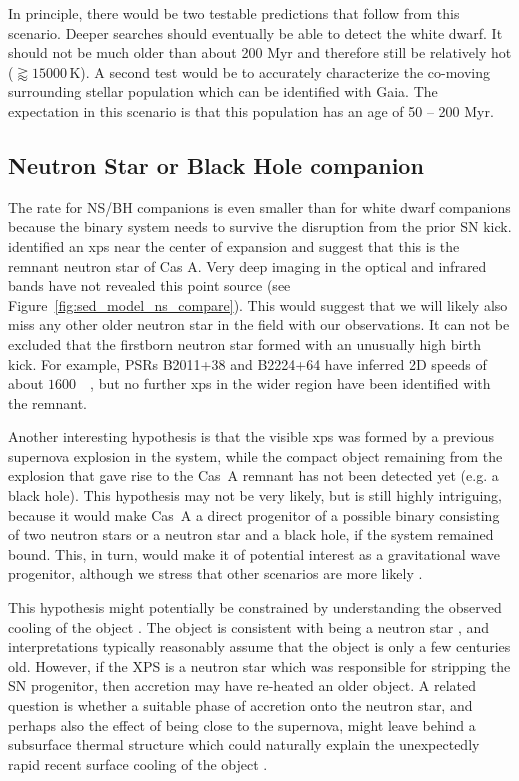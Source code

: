 \documentclass{aa}
\begin{document}
In principle, there would be two testable predictions that follow from this scenario. Deeper searches should eventually be able to detect the white dwarf. It should not be much older than about 200 Myr and therefore still be relatively hot ($\gtrapprox 15000$\,K). A second test would be to accurately characterize the co-moving surrounding stellar population which can be identified with Gaia. The expectation in this scenario is that this population has an age of 50 -- 200 Myr.

\subsection{Neutron Star or Black Hole companion}

The rate for NS/BH companions is even smaller than for white dwarf companions \citep[$\lessapprox 1\%$;][]{2017ApJ...842..125Z} because the binary system needs to survive the disruption from the prior SN kick. \citet{1999IAUC.7246....1T} identified an \gls{xps} near the center of expansion and suggest that this is the remnant neutron star of Cas A. Very deep imaging in the optical and infrared bands \citep{2006ApJ...636..848F} have not revealed this point source (see Figure~\ref{fig:sed_model_ns_compare}). This would suggest that we will likely also miss any other older neutron star in the field with our observations. It can not be excluded that the firstborn neutron star formed with an unusually high birth kick. For example, PSRs B2011+38 and B2224+64 have inferred 2D speeds of about $1600$~\kms\ \citep{2005MNRAS.360..974H}, but no further \gls{xps} in the wider region have been identified with the remnant.

Another interesting hypothesis is that the visible \gls{xps} was formed by a previous supernova explosion in the system, while the compact object remaining from the explosion that gave rise to the Cas~A remnant has not been detected yet (e.g. a black hole). This hypothesis may not be very likely, but is still highly intriguing, because it would make Cas~A a direct progenitor of a possible binary consisting of two neutron stars or a neutron star and a black hole, if the system remained bound. This, in turn, would make it of potential interest as a gravitational wave progenitor, although we stress that other scenarios are more likely \citep[compact companions only make up 5\% of the distribution][]{2017ApJ...842..125Z}.

This hypothesis might potentially be constrained by understanding the observed cooling of the object \citep[e.g.,][]{2010ApJ...719L.167H,2013ApJ...777...22E}.  The object is consistent with being a neutron star \citep[][]{2009Natur.462...71H}, and interpretations typically reasonably assume that the object is only a few centuries old. However, if the XPS is a neutron star which was responsible for stripping the SN progenitor, then accretion may have re-heated an older object.   A related question is whether a suitable phase of accretion onto the neutron star, and perhaps also the effect of being close to the supernova, might leave behind a subsurface thermal structure which could naturally explain the unexpectedly rapid recent surface cooling of the object \citep[][]{2010ApJ...719L.167H,2013ApJ...777...22E}.
\end{document}
